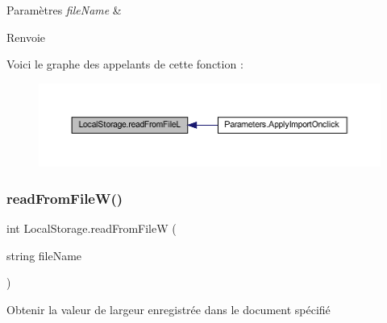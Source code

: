 \begin{DoxyParams}{Paramètres}
{\em file\+Name} & \\
\hline
\end{DoxyParams}
\begin{DoxyReturn}{Renvoie}

\end{DoxyReturn}
Voici le graphe des appelants de cette fonction \+:\nopagebreak
\begin{figure}[H]
\begin{center}
\leavevmode
\includegraphics[width=350pt]{class_local_storage_a2216bc871c8298023f62119bcdf7edb4_icgraph}
\end{center}
\end{figure}
\mbox{\label{class_local_storage_aef684ee38f8d4dccf157503ec6d04a7a}} 
\subsubsection{\texorpdfstring{read\+From\+File\+W()}{readFromFileW()}}
{\footnotesize\ttfamily int Local\+Storage.\+read\+From\+FileW (\begin{DoxyParamCaption}\item[{string}]{file\+Name }\end{DoxyParamCaption})\hspace{0.3cm}{\ttfamily [inline]}}



Obtenir la valeur de largeur enregistrée dans le document spécifié 


